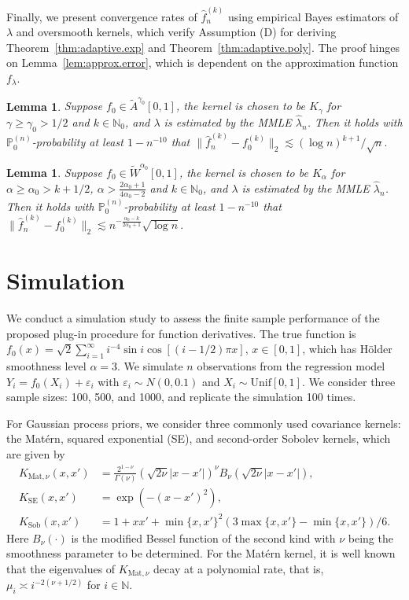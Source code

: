 \documentclass[12pt]{article}
\newcommand{\PP}{\mathbb{P}}
\newcommand{\s}{\sum_{i=1}^{\infty}}
\theoremstyle{plain}
\newtheorem{lemma}[theorem]{Lemma}
\theoremstyle{nonitalicremark}
\begin{document}
Finally, we present convergence rates of $\hat{f}_n^{(k)}$ using empirical Bayes estimators of $\lambda$ and oversmooth kernels, which verify Assumption (D) for deriving Theorem~\ref{thm:adaptive.exp} and Theorem~\ref{thm:adaptive.poly}. The proof hinges on Lemma~\ref{lem:approx.error}, which is dependent on the approximation function $f_\lambda$.


\begin{lemma}\label{lem:exp.mismatch}
Suppose $f_0\in \widetilde{A}^{\gamma_0}[0,1]$, the kernel is chosen to be $K_\gamma$ for $\gamma \geq \gamma_0 > 1/2$ and $k\in\mathbb{N}_0$, and $\lambda$ is estimated by the MMLE $\hat\lambda_n$. Then it holds with $\PP_0^{(n)}$-probability at least $1-n^{-10}$ that
$
\|\hat f_n^{(k)} - f_0^{(k)}\|_2 \lesssim {(\log n)^{k+1}}/{\sqrt{n}}.
$
\end{lemma}

\begin{lemma}\label{lem:poly.mismatch}
Suppose $f_0 \in \widetilde{W}^{\alpha_0}[0,1]$, the kernel is chosen to be $K_\alpha$ for $\alpha \geq \alpha_0 > k+1/2$, $\alpha > \frac{2\alpha_0+1}{4\alpha_0-2}$ and $k\in\mathbb{N}_0$, and $\lambda$ is estimated by the MMLE $\hat\lambda_n$. Then it holds with $\PP_0^{(n)}$-probability at least $1-n^{-10}$ that
$
\|\hat f_n^{(k)} - f_0^{(k)}\|_2 \lesssim n^{-\frac{\alpha_0-k}{2\alpha_0+1}} \sqrt{\log n}.
$
\end{lemma}







\section{Simulation}\label{sec:simulation}

We conduct a simulation study to assess the finite sample performance of the proposed plug-in procedure for function derivatives. The true function is $f_0(x)=\sqrt{2}\s i^{-4}\sin i\cos[(i-1/2)\pi x]$, $x\in[0,1]$, which has H\"older smoothness level $\alpha=3$. We simulate $n$ observations from the regression model $Y_i=f_0(X_i)+\varepsilon_i$ with $\varepsilon_i\sim N(0, 0.1)$ and $X_i\sim \text{Unif}[0,1]$. We consider three sample sizes: 100, 500, and 1000, and replicate the simulation 100 times. 

For Gaussian process priors, we consider three commonly used covariance kernels: the Mat\'ern, squared exponential (SE), and second-order Sobolev kernels, which are given by
\begin{align}
K_{\text{Mat},\nu}(x,x')&=\frac{2^{1-\nu}}{\Gamma(\nu)}\left(\sqrt{2\nu}|x-x'|\right)^\nu B_\nu\left(\sqrt{2\nu}|x-x'|\right),\\
K_{\text{SE}}(x,x')&=\exp(-(x-x')^2),\\
K_{\text{Sob}}(x,x')&=1+xx'+\min\{x,x'\}^2(3\max\{x, x'\}-\min\{x, x'\})/6.
\end{align}
Here $B_\nu(\cdot)$ is the modified Bessel function of the second kind with $\nu$ being the smoothness parameter to be determined. For the Mat\'ern kernel, it is well known that the eigenvalues of $K_{\text{Mat},\nu}$ decay at a polynomial rate, that is,  $\mu_i\asymp i^{-2(\nu+1/2)}$ for $i\in\mathbb{N}$. 
\end{document}
